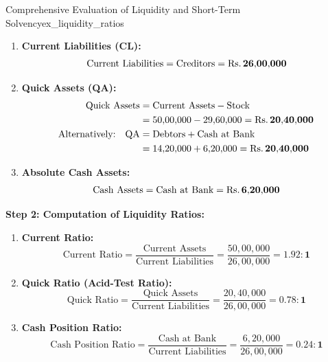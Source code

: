 \begin{example}{Comprehensive Evaluation of Liquidity and Short-Term Solvency}{ex_liquidity_ratios}
\begin{enumerate}[leftmargin=*]
    \item \textbf{Current Liabilities (CL):}
    \begin{equation*}
        \text{Current Liabilities} = \text{Creditors} = \mathbf{\text{Rs.}\, 26{,}00{,}000}
    \end{equation*}

    \item \textbf{Quick Assets (QA):}
    \begin{align*}
        \text{Quick Assets} &= \text{Current Assets} - \text{Stock} \\
                            &= 50{,}00{,}000 - 29{,}60{,}000 = \mathbf{\text{Rs.}\, 20{,}40{,}000} \\
        \text{Alternatively:} \quad \text{QA} &= \text{Debtors} + \text{Cash at Bank} \\
                            &= 14{,}20{,}000 + 6{,}20{,}000 = \mathbf{\text{Rs.}\, 20{,}40{,}000}
    \end{align*}

    \item \textbf{Absolute Cash Assets:}
    \begin{equation*}
        \text{Cash Assets} = \text{Cash at Bank} = \mathbf{\text{Rs.}\, 6{,}20{,}000}
    \end{equation*}
\end{enumerate}

\tcbline
\textbf{Step 2: Computation of Liquidity Ratios:}
\begin{enumerate}[leftmargin=*]
    \item \textbf{Current Ratio:}
    \begin{equation*}
        \text{Current Ratio} = \frac{\text{Current Assets}}{\text{Current Liabilities}} = \frac{50{,}00{,}000}{26{,}00{,}000} = \mathbf{1.92 : 1}
    \end{equation*}

    \item \textbf{Quick Ratio (Acid-Test Ratio):}
    \begin{equation*}
        \text{Quick Ratio} = \frac{\text{Quick Assets}}{\text{Current Liabilities}} = \frac{20{,}40{,}000}{26{,}00{,}000} = \mathbf{0.78 : 1}
    \end{equation*}

    \item \textbf{Cash Position Ratio:}
    \begin{equation*}
        \text{Cash Position Ratio} = \frac{\text{Cash at Bank}}{\text{Current Liabilities}} = \frac{6{,}20{,}000}{26{,}00{,}000} = \mathbf{0.24 : 1}
    \end{equation*}
\end{enumerate}


\end{example}
